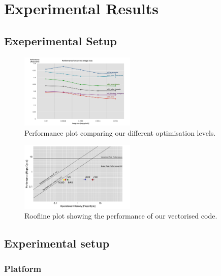 \section{Experimental Results}\label{sec:exp}
\subsection{Exeperimental Setup}\label{sec:exp_setup8}

\setlength\fboxsep{0pt}
\setlength\fboxrule{0.5pt}
 
\begin{figure}\vspace{-1mm}
  \includegraphics[trim=10mm 0mm 10mm 0mm, clip, width=0.49\textwidth]{figures/performance}
  \caption{Performance plot comparing our different optimisation levels.\label{performance}}
\end{figure}
 
\begin{figure}\vspace{-1mm}
  \includegraphics[trim=10mm 0mm 10mm 0mm, clip, width=0.49\textwidth]{figures/roofline}
  \caption{Roofline plot showing the performance of our vectorised code.\label{roofline}}
\end{figure}


\subsection{Experimental setup}
\subsubsection{Platform}
